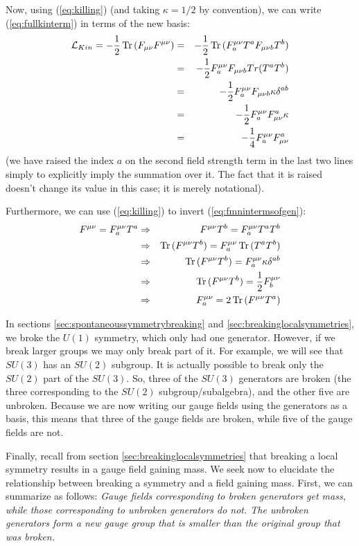 \documentclass[12pt,epsf]{article}
\def\nolabel{\nonumber }
\def\nolabel{\nonumber }
\def\Tr{\mathop{\rm Tr \,} \nolimits}
\begin{document}
Now, using (\ref{eq:killing}) (and taking $\kappa = 1/2$ by
convention), we can write (\ref{eq:fullkinterm}) in terms of the new
basis:
\begin{eqnarray}
\mathcal{L}_{Kin} = -{1\over 2}\Tr(F_{\mu \nu}F^{\mu \nu}) &=& -{1 \over
2}\Tr(F_a^{\mu \nu}T^aF_{\mu \nu b}T^b) \nolabel \\
&=& -{1\over 2}F^{\mu \nu}_aF_{\mu \nu b}Tr(T^aT^b) \nolabel \\
&=& -{1\over 2}F^{\mu \nu}_a F_{\mu \nu b}\kappa \delta^{ab} \nolabel
\\
&=& -{1\over 2}F^{\mu \nu}_a F^a_{\mu \nu}\kappa \nolabel \\
&=& -{1\over 4}F^{\mu \nu}_a F^a_{\mu \nu}  \label{eq:xcvzxcv}
\end{eqnarray}
(we have raised the index $a$ on the second field strength term in the
last two lines simply to explicitly imply the summation over it.  The
fact that it is raised doesn't change its value in this case; it is
merely notational).  

Furthermore, we can use (\ref{eq:killing}) to invert
(\ref{eq:fmnintermsofgen}):
\begin{eqnarray}
F^{\mu \nu} = F^{\mu \nu}_aT^a &\Rightarrow & F^{\mu \nu} T^b = F^{\mu
\nu}_a T^aT^b \nolabel \\
&\Rightarrow& \Tr(F^{\mu \nu}T^b) = F^{\mu \nu}_a \Tr(T^aT^b) \nolabel \\
&\Rightarrow& \Tr(F^{\mu \nu}T^b) = F^{\mu \nu}_a\kappa \delta^{ab}
\nolabel \\
&\Rightarrow& \Tr(F^{\mu \nu}T^b) = {1\over 2}F^{\mu \nu}_b \nolabel \\
&\Rightarrow& F^{\mu \nu}_a = 2 \Tr(F^{\mu \nu}T^a) \label{eq:firstiwant}
\end{eqnarray}

In sections \ref{sec:spontaneoussymmetrybreaking} and
\ref{sec:breakinglocalsymmetries}, we broke the $U(1)$ symmetry, which
only had one generator.  However, if we break larger groups we may only
break part of it.  For example, we will see that $SU(3)$ has an $SU(2)$
subgroup.  It is actually possible to break only the $SU(2)$ part of
the $SU(3)$.  So, three of the $SU(3)$ generators are broken (the three
corresponding to the $SU(2)$ subgroup/subalgebra), and the other five
are unbroken.  Because we are now writing our gauge fields using the
generators as a basis, this means that three of the gauge fields are
broken, while five of the gauge fields are not.  

Finally, recall from section \ref{sec:breakinglocalsymmetries} that
breaking a local symmetry results in a gauge field gaining mass.  We
seek now to elucidate the relationship between breaking a symmetry and
a field gaining mass.  First, we can summarize as follows: \it Gauge
fields corresponding to broken generators get mass, while those
corresponding to unbroken generators do not.  The unbroken generators
form a new gauge group that is smaller than the original group that was
broken\rm.  
\end{document}
